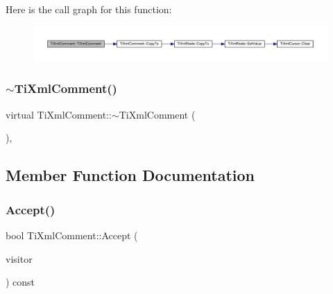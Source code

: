 Here is the call graph for this function\+:\nopagebreak
\begin{figure}[H]
\begin{center}
\leavevmode
\includegraphics[width=350pt]{class_ti_xml_comment_afaec41ac2760ce946ba1590eb5708e50_cgraph}
\end{center}
\end{figure}
\mbox{\label{class_ti_xml_comment_a3264ae2e9c4a127edfa03289bb2c9aa2}} 
\subsubsection{\texorpdfstring{$\sim$\+Ti\+Xml\+Comment()}{~TiXmlComment()}}
{\footnotesize\ttfamily virtual Ti\+Xml\+Comment\+::$\sim$\+Ti\+Xml\+Comment (\begin{DoxyParamCaption}{ }\end{DoxyParamCaption})\hspace{0.3cm}{\ttfamily [inline]}, {\ttfamily [virtual]}}



\subsection{Member Function Documentation}
\mbox{\label{class_ti_xml_comment_ac894241530d1d266131a5026cb251a95}} 
\subsubsection{\texorpdfstring{Accept()}{Accept()}}
{\footnotesize\ttfamily bool Ti\+Xml\+Comment\+::\+Accept (\begin{DoxyParamCaption}\item[{\hyperlink{class_ti_xml_visitor}{Ti\+Xml\+Visitor} $\ast$}]{visitor }\end{DoxyParamCaption}) const\hspace{0.3cm}{\ttfamily [virtual]}}

